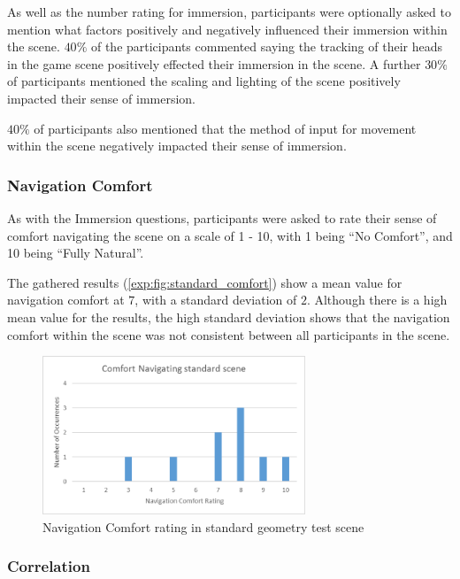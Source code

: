 				As well as the number rating for immersion, participants were optionally asked to mention what factors positively and negatively influenced their immersion within the scene.
				$40\%$ of the participants commented saying the tracking of their heads in the game scene positively effected their immersion in the scene.
				A further $30\%$ of participants mentioned the scaling and lighting of the scene positively impacted their sense of immersion.

				$40\%$ of participants also mentioned that the method of input for movement within the scene negatively impacted their sense of immersion.

			\subsubsection{Navigation Comfort}

				As with the Immersion questions, participants were asked to rate their sense of comfort navigating the scene on a scale of 1 - 10, with 1 being \enquote{No Comfort}, and 10 being \enquote{Fully Natural}.

				The gathered results (\autoref{exp:fig:standard_comfort}) show a mean value for navigation comfort at $7$, with a standard deviation of $2$.
				Although there is a high mean value for the results, the high standard deviation shows that the navigation comfort within the scene was not consistent between all participants in the scene.

				\begin{figure}[h]
					\includegraphics[width=0.7\textwidth]{Images/Standard_Comfort}
					\centering
					\caption{Navigation Comfort rating in standard geometry test scene}
					\label{exp:fig:standard_comfort}
				\end{figure}

			\subsubsection{Correlation}

